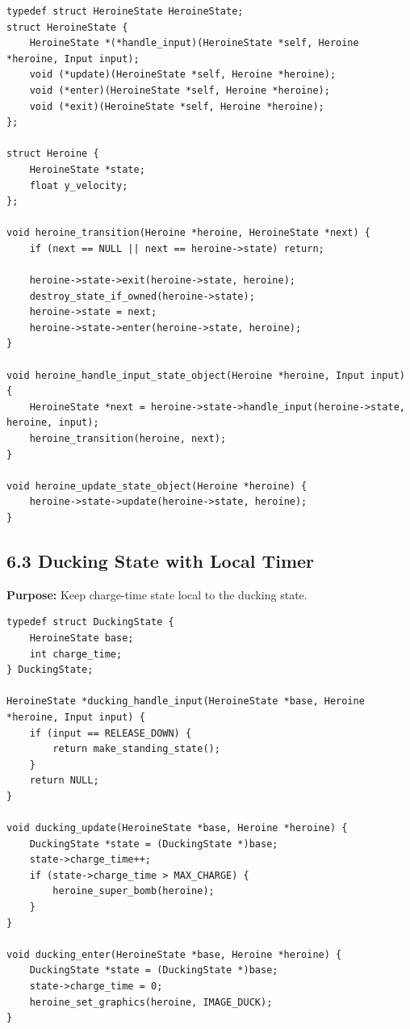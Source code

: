 \documentclass[10pt,letterpaper]{article}
\begin{document}
\begin{verbatim}
typedef struct HeroineState HeroineState;
struct HeroineState {
    HeroineState *(*handle_input)(HeroineState *self, Heroine *heroine, Input input);
    void (*update)(HeroineState *self, Heroine *heroine);
    void (*enter)(HeroineState *self, Heroine *heroine);
    void (*exit)(HeroineState *self, Heroine *heroine);
};

struct Heroine {
    HeroineState *state;
    float y_velocity;
};

void heroine_transition(Heroine *heroine, HeroineState *next) {
    if (next == NULL || next == heroine->state) return;

    heroine->state->exit(heroine->state, heroine);
    destroy_state_if_owned(heroine->state);
    heroine->state = next;
    heroine->state->enter(heroine->state, heroine);
}

void heroine_handle_input_state_object(Heroine *heroine, Input input) {
    HeroineState *next = heroine->state->handle_input(heroine->state, heroine, input);
    heroine_transition(heroine, next);
}

void heroine_update_state_object(Heroine *heroine) {
    heroine->state->update(heroine->state, heroine);
}
\end{verbatim}

\subsection{6.3 Ducking State with Local Timer}

\textbf{Purpose:} Keep charge-time state local to the ducking state.

\begin{verbatim}
typedef struct DuckingState {
    HeroineState base;
    int charge_time;
} DuckingState;

HeroineState *ducking_handle_input(HeroineState *base, Heroine *heroine, Input input) {
    if (input == RELEASE_DOWN) {
        return make_standing_state();
    }
    return NULL;
}

void ducking_update(HeroineState *base, Heroine *heroine) {
    DuckingState *state = (DuckingState *)base;
    state->charge_time++;
    if (state->charge_time > MAX_CHARGE) {
        heroine_super_bomb(heroine);
    }
}

void ducking_enter(HeroineState *base, Heroine *heroine) {
    DuckingState *state = (DuckingState *)base;
    state->charge_time = 0;
    heroine_set_graphics(heroine, IMAGE_DUCK);
}
\end{verbatim}
\end{document}
